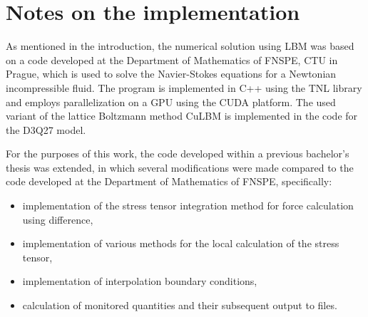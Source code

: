\section{Notes on the implementation}\label{poznamky k implementaci LBM}
As mentioned in the introduction, the numerical solution using LBM was based on a code developed at the Department of Mathematics of FNSPE, CTU in Prague, which is used to solve the Navier-Stokes equations for a Newtonian incompressible fluid. The program is implemented in C++ using the TNL library \cite{Oberhuber2021, Klinkovsky2022} and employs parallelization on a GPU using the CUDA platform. The used variant of the lattice Boltzmann method CuLBM is implemented in the code for the D3Q27 model.

For the purposes of this work, the code developed within a previous bachelor's thesis \cite{JB} was extended, in which several modifications were made compared to the code developed at the Department of Mathematics of FNSPE, specifically:
\begin{itemize}
	\item implementation of the stress tensor integration method for force calculation using difference,
	\item implementation of various methods for the local calculation of the stress tensor,
	\item implementation of interpolation boundary conditions,
	\item calculation of monitored quantities and their subsequent output to files.
\end{itemize}
